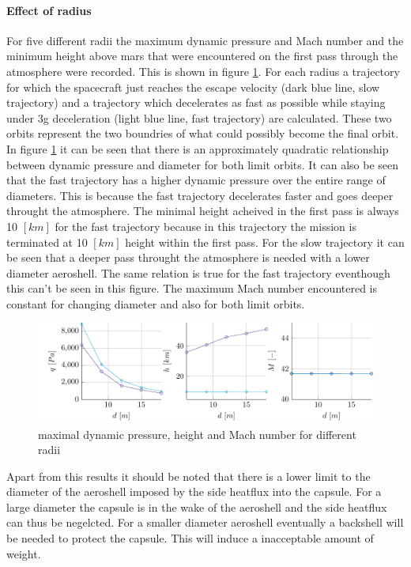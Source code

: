 \paragraph{Effect of radius}

For five different radii the maximum dynamic pressure and Mach number and the minimum height above mars that were encountered on the first pass through the atmosphere were recorded. This is shown in figure \ref{fig:radius}. For each radius a trajectory for which the spacecraft just reaches the escape velocity (dark blue line, slow trajectory) and a trajectory which decelerates as fast as possible while staying under 3g deceleration (light blue line, fast trajectory) are calculated. These two orbits represent the two boundries of what could possibly become the final orbit. In figure \ref{fig:radius} it can be seen that there is an approximately quadratic relationship between dynamic pressure and diameter for both limit orbits. It can also be seen that the fast trajectory has a higher dynamic pressure over the entire range of diameters. This is because the fast trajectory decelerates faster and goes deeper throught the atmosphere. The minimal height acheived in the first pass is always 10 $\left[km\right]$ for the fast trajectory because in this trajectory the mission is terminated at 10 $\left[km\right]$ height within the first pass. For the slow trajectory it can be seen that a deeper pass throught the atmosphere is needed with a lower diameter aeroshell. The same relation is true for the fast trajectory eventhough this can't be seen in this figure. The maximum Mach number encountered is constant for changing diameter and also for both limit orbits.

\begin{figure}[H]
	\centering
	\includegraphics[width=\textwidth]{./Figure/orbit/radius_param.pdf}
	\caption{maximal dynamic pressure, height and Mach number for different radii}
	\label{fig:radius}
\end{figure}


Apart from this results it should be noted that there is a lower limit to the diameter of the aeroshell imposed by the side heatflux into the capsule. For a large diameter the capsule is in the wake of the aeroshell and the side heatflux can thus be negelcted. For a smaller diameter aeroshell eventually a backshell will be needed to protect the capsule. This will induce a inacceptable amount of weight.


